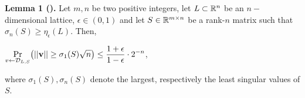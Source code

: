 \begin{enumerate}
	\textbf{Lemma 1 (\cite{AGH+12}).} Let $m,n$ be two positive integers,  let $L \subset \mathbb{R}^n$ be an $n-$dimensional lattice, $\epsilon \in (0,1)$ and let $S\in\mathbb{R}^{m\times n}$ be a rank-$n$ matrix such that $\sigma_n(S) \geq \eta_\epsilon(L)$. Then, 
	\begin{center}
		$\displaystyle{\Pr_{v \leftarrow\mathcal{D}_{L, S}}} \big( ||\textbf{v}|| \geq \sigma_1(S) \sqrt{n} \big)\leq \frac{1 + \epsilon}{1 - \epsilon} \cdot 2^{-n}$,
	\end{center}
where $\sigma_1(S), \sigma_n(S)$ denote the largest, respectively the least singular values of $S$.


\end{enumerate}

